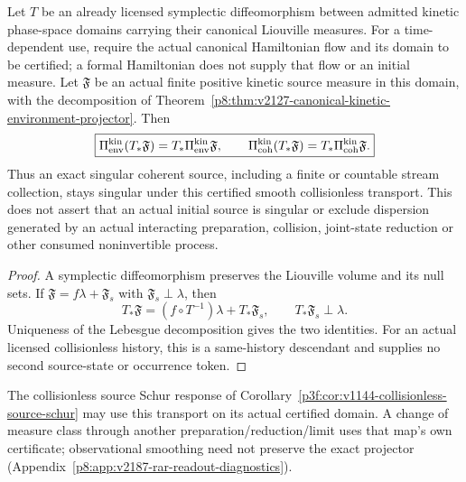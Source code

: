 \documentclass[12pt,a4paper]{article}
\begin{document}
\begin{lemma}
\label{p8:lem:v2187-canonical-kinetic-projector-transport}
Let $T$ be an already licensed symplectic diffeomorphism between admitted
kinetic phase-space domains carrying their canonical Liouville measures.
For a time-dependent use, require the actual canonical Hamiltonian flow and
its domain to be certified; a formal Hamiltonian does not supply that flow
or an initial measure.  Let $\mathfrak F$ be an actual finite positive kinetic
source measure in this domain, with the decomposition of
Theorem~\ref{p8:thm:v2127-canonical-kinetic-environment-projector}.
Then
\begin{equation}
\label{p8:eq:v2187-projector-transport}
 \boxed{\Pi_{\rm env}^{\rm kin}(T_*\mathfrak F)
 =T_*\Pi_{\rm env}^{\rm kin}\mathfrak F,
 \qquad
 \Pi_{\rm coh}^{\rm kin}(T_*\mathfrak F)
 =T_*\Pi_{\rm coh}^{\rm kin}\mathfrak F.}
\end{equation}
Thus an exact singular coherent source, including a finite or countable
stream collection, stays singular under this certified smooth collisionless
transport.  This does not assert that an actual initial source is singular
or exclude dispersion generated by an actual interacting preparation,
collision, joint-state reduction or other consumed noninvertible process.
\end{lemma}
\begin{proof}
A symplectic diffeomorphism preserves the Liouville volume and its null
sets.  If $\mathfrak F=f\lambda+\mathfrak F_s$ with
$\mathfrak F_s\perp\lambda$, then
\[
 T_*\mathfrak F=(f\circ T^{-1})\lambda+T_*\mathfrak F_s,
 \qquad T_*\mathfrak F_s\perp\lambda.
\]
Uniqueness of the Lebesgue decomposition gives the two identities.  For an
actual licensed collisionless history, this is a same-history descendant
and supplies no second source-state or occurrence token.
\end{proof}
The collisionless source Schur response of
Corollary~\ref{p3f:cor:v1144-collisionless-source-schur} may use this
transport on its actual certified domain.  A change of measure class through
another preparation/reduction/limit uses that map's own certificate;
observational smoothing need not preserve the exact projector
(Appendix~\ref{p8:app:v2187-rar-readout-diagnostics}).

\end{document}
